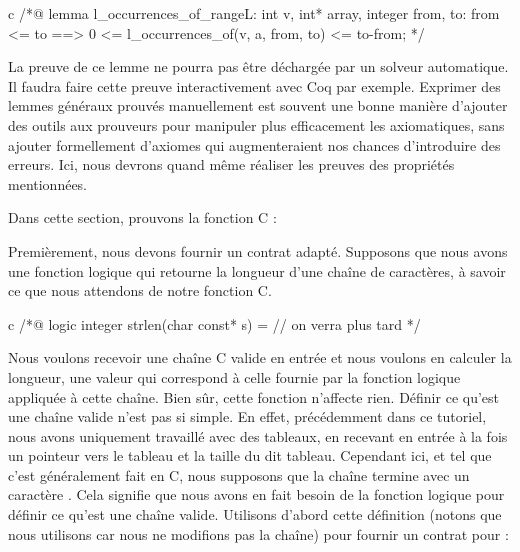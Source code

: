 \begin{CodeBlock}{c}
/*@
lemma l_occurrences_of_range{L}:
  \forall int v, int* array, integer from, to:
    from <= to ==> 0 <= l_occurrences_of(v, a, from, to) <= to-from;
*/
\end{CodeBlock}



La preuve de ce lemme ne pourra pas être déchargée par un solveur automatique. Il
faudra faire cette preuve interactivement avec Coq par exemple. Exprimer des
lemmes généraux prouvés manuellement est souvent une bonne manière d'ajouter des
outils aux prouveurs pour manipuler plus efficacement les axiomatiques, sans
ajouter formellement d'axiomes qui augmenteraient nos chances d'introduire des
erreurs. Ici, nous devrons quand même réaliser les preuves des propriétés
mentionnées.




Dans cette section, prouvons la fonction C :




Premièrement, nous devons fournir un contrat adapté. Supposons que nous avons
une fonction logique  qui retourne la longueur d'une chaîne
de caractères, à savoir ce que nous attendons de notre fonction C.


\begin{CodeBlock}{c}
/*@
  logic integer strlen(char const* s) = // on verra plus tard
*/
\end{CodeBlock}


Nous voulons recevoir une chaîne C valide en entrée et nous voulons en
calculer la longueur, une valeur qui correspond à celle fournie par la
fonction logique  appliquée à cette chaîne. Bien sûr,
cette fonction n'affecte rien. Définir ce qu'est une chaîne valide n'est
pas si simple. En effet, précédemment dans ce tutoriel, nous avons uniquement
travaillé avec des tableaux, en recevant en entrée à la fois un pointeur
vers le tableau et la taille du dit tableau. Cependant ici, et tel que
c'est généralement fait en C, nous supposons que la chaîne termine avec
un caractère . Cela signifie que nous
avons en fait besoin de la fonction logique  pour
définir ce qu'est une chaîne valide. Utilisons d'abord cette définition
(notons que nous utilisons 
car nous ne modifions pas la chaîne) pour fournir un contrat pour
 :


